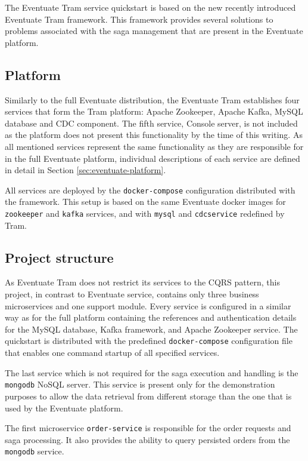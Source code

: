 \documentclass[oneside,
  digital, %
  table,   %
  lof,     %
  lot,     %
]{fithesis3}
\begin{document}
The Eventuate Tram service quickstart is based on the new recently introduced Eventuate Tram framework. This framework provides several solutions to problems associated with the saga management that are present in the Eventuate platform.

\subsection{Platform}

Similarly to the full Eventuate distribution, the Eventuate Tram establishes four services that form the Tram platform: Apache Zookeeper, Apache Kafka, MySQL database and CDC component. The fifth service, Console server, is not included as the platform does not present this functionality by the time of this writing. As all mentioned services represent the same functionality as they are responsible for in the full Eventuate platform, individual descriptions of each service are defined in detail in Section \ref{sec:eventuate-platform}.  

All services are deployed by the \texttt{docker-compose} configuration distributed with the framework. This setup is based on the same Eventuate docker images for \texttt{zookeeper} and \texttt{kafka} services, and with \texttt{mysql} and \texttt{cdcservice} redefined by Tram.

\subsection{Project structure}

As Eventuate Tram does not restrict its services to the CQRS pattern, this project, in contrast to Eventuate service, contains only three business microservices and one support module. Every service is configured in a similar way as for the full platform containing the references and authentication details for the MySQL database, Kafka framework, and Apache Zookeeper service. The quickstart is distributed with the predefined \texttt{docker-compose} configuration file that enables one command startup of all specified services.

The last service which is not required for the saga execution and handling is the \texttt{mongodb} NoSQL server. This service is present only for the demonstration purposes to allow the data retrieval from different storage than the one that is used by the Eventuate platform.

The first microservice \texttt{order-service} is responsible for the order requests and saga processing. It also provides the ability to query persisted orders from the \texttt{mongodb} service.
\end{document}
